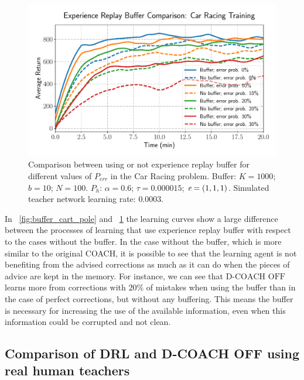 \begin{figure}[H]
    \centering
    \vspace{-0.2cm}
    \includegraphics[width=0.66\linewidth]{imagenes/cap3/bufferCarRacing.pdf}
    \vspace{-0.2cm}
    \caption[Comparison between using or not experience replay buffer for different values of $P_\mathit{err}$ in the Car Racing problem.]{Comparison between using or not experience replay buffer for different values of $P_\mathit{err}$ in the Car Racing problem. Buffer: $K = 1000$; $b = 10$; $N = 100$. $P_{h}$: $\alpha = 0.6$; $\tau = 0.000015$; $\emph{e}=(1, 1, 1)$. Simulated teacher network learning rate: $0.0003$.}
    \label{fig:buffer_car_racing}
    \vspace{-0.2cm}
\end{figure}

In \figurename~{\ref{fig:buffer_cart_pole}} and \figurename~{\ref{fig:buffer_car_racing}} the learning curves show a large difference between the processes of learning that use experience replay buffer with respect to the cases without the buffer. In the case without the buffer, which is more similar to the original COACH, it is possible to see that the learning agent is not benefiting from the advised corrections as much as it can do when the pieces of advice are kept in the memory. For instance, we can see that $\text{D-COACH OFF}$ learns more from corrections with $20 \%$ of mistakes when using the buffer than in the case of perfect corrections, but without any buffering. This means the buffer is necessary for increasing the use of the available information, even when this information could be corrupted and not clean.

\subsection{Comparison of DRL and D-COACH OFF using real human teachers}

